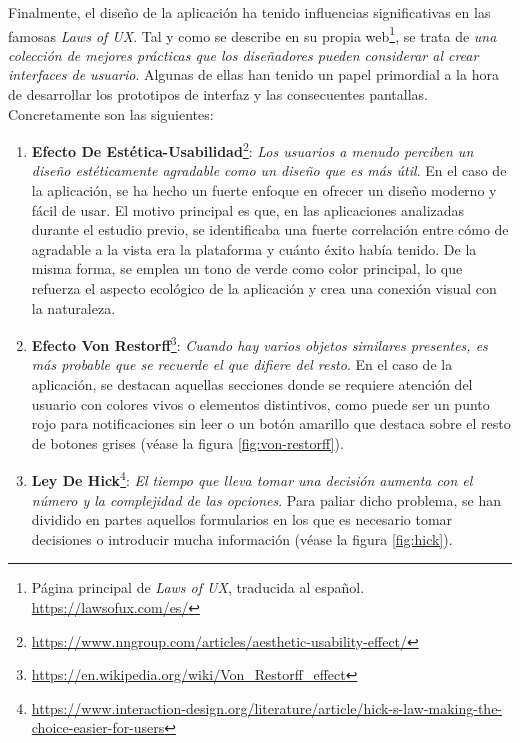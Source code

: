 Finalmente, el diseño de la aplicación ha tenido influencias significativas en las famosas \textit{Laws of UX}. Tal y como se describe en su propia web\footnote{Página principal de \textit{Laws of UX}, traducida al español. \url{https://lawsofux.com/es/}}, se trata de \textit{una colección de mejores prácticas que los diseñadores pueden considerar al crear interfaces de usuario}. Algunas de ellas han tenido un papel primordial a la hora de desarrollar los prototipos de interfaz y las consecuentes pantallas. Concretamente son las siguientes:



\begin{enumerate}
    \item \textbf{Efecto De Estética-Usabilidad}\footnote{\url{https://www.nngroup.com/articles/aesthetic-usability-effect/}}: \textit{Los usuarios a menudo perciben un diseño estéticamente agradable como un diseño que es más útil}. En el caso de la aplicación, se ha hecho un fuerte enfoque en ofrecer un diseño moderno y fácil de usar. El motivo principal es que, en las aplicaciones analizadas durante el estudio previo, se identificaba una fuerte correlación entre cómo de agradable a la vista era la plataforma y cuánto éxito había tenido. De la misma forma, se emplea un tono de verde como color principal, lo que refuerza el aspecto ecológico de la aplicación y crea una conexión visual con la naturaleza. 

    \item \textbf{Efecto Von Restorff}\footnote{\url{https://en.wikipedia.org/wiki/Von_Restorff_effect}}: \textit{Cuando hay varios objetos similares presentes, es más probable que se recuerde el que difiere del resto}. En el caso de la aplicación, se destacan aquellas secciones donde se requiere atención del usuario con colores vivos o elementos distintivos, como puede ser un punto rojo para notificaciones sin leer o un botón amarillo que destaca sobre el resto de botones grises (véase la figura \ref{fig:von-restorff}).

    
    \item \textbf{Ley De Hick}\footnote{\url{https://www.interaction-design.org/literature/article/hick-s-law-making-the-choice-easier-for-users}}: \textit{El tiempo que lleva tomar una decisión aumenta con el número y la complejidad de las opciones}. Para paliar dicho problema, se han dividido en partes aquellos formularios en los que es necesario tomar decisiones o introducir mucha información (véase la figura \ref{fig:hick}). 
    

\end{enumerate}
